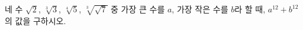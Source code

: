 네 수 $\sqrt{2}$, $\sqrt[3]{3}$, $\sqrt[4]{5}$, $\sqrt[3]{\sqrt{7}}$ 중 가장 큰 수를 $a$, 가장 작은 수를 $b$라 할 때, $a^{12}+b^{12}$의 값을 구하시오.
